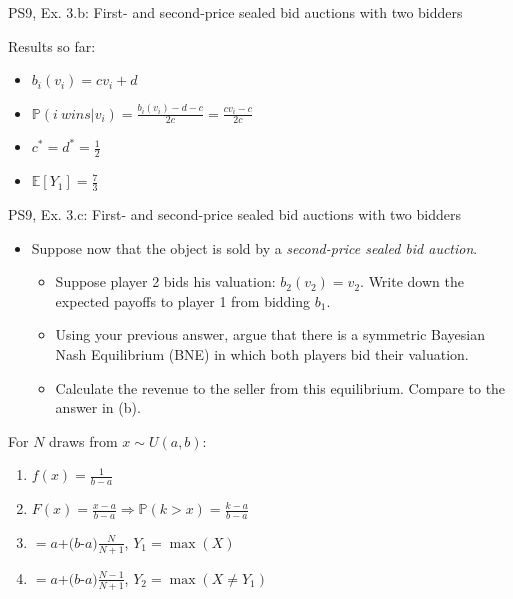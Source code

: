 \begin{frame}{PS9, Ex. 3.b: First- and second-price sealed bid auctions with two bidders}
\begin{multicols}{2}
      \vspace{-6pt}
      Results so far:
      \vspace{-6pt}
      \begin{itemize}
        \item[($*$)]  $b_i(v_i) = cv_i+d$
        \item[($**$)] $\mathbb{P}(i\ wins|v_i)=\frac{b_i(v_i)-d-c}{2c}=\frac{cv_i-c}{2c}$
        \item[(3.a)]    $c^*=d^*=\frac{1}{2}$
        \item[\nth{1}:] $\mathbb{E}[Y_1]=\frac{7}{3}$
      \end{itemize}
      \vfill\null
    \end{multicols}
\end{frame}



\begin{frame}{PS9, Ex. 3.c: First- and second-price sealed bid auctions with two bidders}
    \begin{multicols}{2}
      \begin{itemize}
        \item[(c)] Suppose now that the object is sold by a \textit{second-price sealed bid auction}.
        \begin{itemize}\normalsize
          \item[i.]   Suppose player 2 bids his valuation: $b_2(v_2) = v_2$. Write down the expected payoffs to player 1 from bidding $b_1$.
          \item[ii.]  Using your previous answer, argue that there is a symmetric Bayesian Nash Equilibrium (BNE) in which both players bid their valuation.
          \item[iii.] Calculate the revenue to the seller from this equilibrium. Compare to the answer in (b).
        \end{itemize}
      \end{itemize}
      For $N$ draws from $x\sim U(a, b):$
      \vspace{-6pt}
      \begin{enumerate}
        \item[PDF:] $f(x)=\frac{1}{b-a}$
        \item[CDF:] $F(x)=\frac{x-a}{b-a}\Rightarrow\mathbb{P}(k>x)=\frac{k-a}{b-a}$
        \item[$\mathbb{E}(Y_1)$] $=a$+$(b$-$a)\frac{N}{N+1}$, $Y_1=\max(X)$
        \item[$\mathbb{E}(Y_2)$] $=a$+$(b$-$a)\frac{N-1}{N+1}$, $Y_2=\max(X\neq Y_1)$
      \end{enumerate}
      \vfill\null\columnbreak
      \vfill\null
    \end{multicols}
\end{frame}


